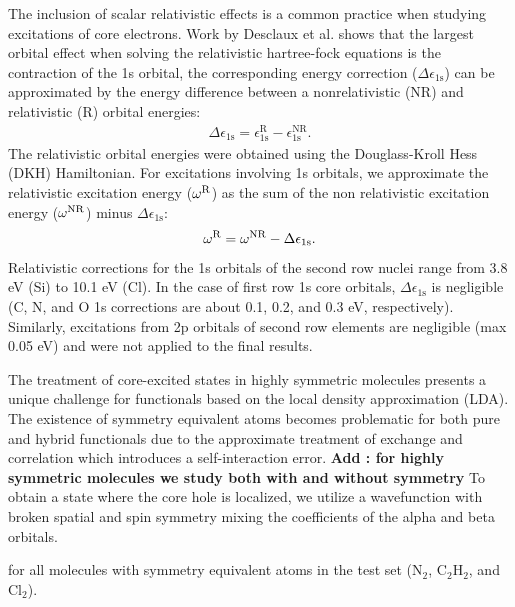\documentclass[12pt]{article}
\begin{document}
The inclusion of scalar relativistic effects is a common practice when studying excitations of core electrons.\cite{maganas_l-edge_2014,debeer_george_calibration_2010,bauer_herfd-xas_2014,ankudinov_sensitivity_2002}
Work by Desclaux et al. \cite{desclaux_relativistic_1971} shows that the largest orbital effect when solving the relativistic hartree-fock equations is the contraction of the 1s orbital, the corresponding energy correction ($\Delta\epsilon_{\text{1s}}$) can be approximated by the energy difference between a nonrelativistic (NR) and relativistic (R) orbital energies:
\begin{align}
\Delta\epsilon_{\text{1s}} = \epsilon_{\text{1s}}^{\text{R}} - \epsilon_{\text{1s}}^{\text{NR}}.
\end{align}
The relativistic orbital energies were obtained using the Douglass-Kroll Hess (DKH) Hamiltonian.\cite{douglas_quantum_1973,hess_applicability_1985, hess_relativistic_1986}
For excitations involving 1s orbitals, we approximate the relativistic excitation energy ($\omega^{\rm R}$) as the sum of the non relativistic excitation energy ($ \omega^{\rm NR}$) minus $\Delta\epsilon_{\text{1s}}$:
\begin{align}
\omega^{\rm R} = \omega^{\rm NR} - \Delta\epsilon_{\text{1s}}.
\end{align}
Relativistic corrections for the 1s orbitals of the second row nuclei range from 3.8 eV (Si) to 10.1 eV (Cl). 
In the case of first row 1s core orbitals, $\Delta\epsilon_{\text{1s}}$ is negligible (C, N, and O 1s corrections are about 0.1, 0.2, and 0.3 eV, respectively).  Similarly, excitations from 2p orbitals of second row elements are negligible (max 0.05 eV) and were not applied to the final results.

The treatment of core-excited states in highly symmetric molecules presents a unique challenge for functionals based on the local density approximation (LDA). The existence of symmetry equivalent atoms becomes problematic for both pure and hybrid functionals due to the approximate treatment of exchange and correlation which introduces a self-interaction error.\cite{bally_incorrect_1997,lundberg_quantifying_2005}
\textbf{Add : for highly symmetric molecules we study both with and without symmetry}
To obtain a state where the core hole is localized, we utilize a wavefunction with broken spatial and spin symmetry mixing the coefficients of the alpha and beta orbitals.

 for all molecules with symmetry equivalent atoms in the test set (N$_2$, C$_2$H$_2$, and Cl$_2$).
\end{document}
